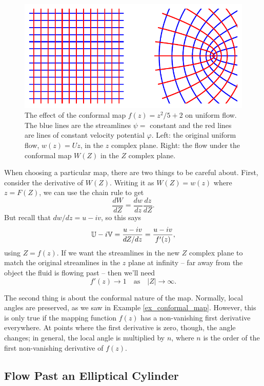 \begin{figure}
\centering\includegraphics[width=0.75\linewidth]{Figures/Chapter4/fig_conformal_map}
\caption{The effect of the conformal map $f(z) = z^2/5 + 2$ on uniform flow.  The blue lines are the streamlines $\psi = $ constant and the red lines are lines of constant velocity potential $\varphi$.  Left: the original uniform flow, $w(z) = Uz$, in the $z$ complex plane.  Right: the flow under the conformal map $W(Z)$ in the $Z$ complex plane.}
\label{fig_conformal_map}
\end{figure}


When choosing a particular map, there are two things to be careful about.  First, consider the derivative of $W(Z)$.  Writing it as $W(Z) = w(z)$ where $z = F(Z)$, we can use the chain rule to get
\[
\frac{dW}{dZ} = \frac{dw}{dz}\frac{dz}{dZ}.
\]
But recall that $dw/dz = u - iv$, so this says
\begin{equation}
\label{eq_UV}
\mathbb{U} - i\mathbb{V} = \frac{u - iv}{dZ/dz} = \frac{u - iv}{f'(z)},
\end{equation}
using $Z = f(z)$.  If we want the streamlines in the new $Z$ complex plane to match the original streamlines in the $z$ plane at infinity -- far away from the object the fluid is flowing past -- then we'll need
\begin{equation}
f'(z) \to 1 \quad \text{as} \quad |Z| \to \infty.
\end{equation}

The second thing is about the conformal nature of the map.  Normally, local angles are preserved, as we saw in Example \ref{ex_conformal_map}.  However, this is only true if the mapping function $f(z)$ has a non-vanishing first derivative everywhere.  At points where the first derivative is zero, though, the angle changes; in general, the local angle is multiplied by $n$, where $n$ is the order of the first non-vanishing derivative of $f(z)$.  



\subsection{Flow Past an Elliptical Cylinder}

